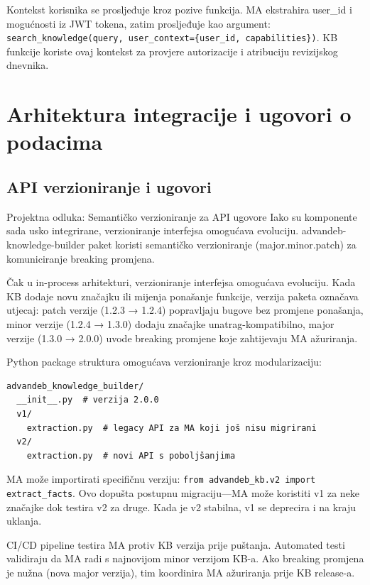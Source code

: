 \documentclass[12pt,a4paper]{article}
\begin{document}
Kontekst korisnika se prosljeđuje kroz pozive funkcija. MA ekstrahira user\_id i mogućnosti iz JWT tokena, zatim prosljeđuje kao argument: \texttt{search\_knowledge(query, user\_context=\{user\_id, capabilities\})}. KB funkcije koriste ovaj kontekst za provjere autorizacije i atribuciju revizijskog dnevnika.

\section{Arhitektura integracije i ugovori o podacima}

\subsection{API verzioniranje i ugovori}

\begin{rationale}{Projektna odluka: Semantičko verzioniranje za API ugovore}
Iako su komponente sada usko integrirane, verzioniranje interfejsa omogućava evoluciju. advandeb-knowledge-builder paket koristi semantičko verzioniranje (major.minor.patch) za komuniciranje breaking promjena.
\end{rationale}

Čak u in-process arhitekturi, verzioniranje interfejsa omogućava evoluciju. Kada KB dodaje novu značajku ili mijenja ponašanje funkcije, verzija paketa označava utjecaj: patch verzije (1.2.3 → 1.2.4) popravljaju bugove bez promjene ponašanja, minor verzije (1.2.4 → 1.3.0) dodaju značajke unatrag-kompatibilno, major verzije (1.3.0 → 2.0.0) uvode breaking promjene koje zahtijevaju MA ažuriranja.

Python package struktura omogućava verzioniranje kroz modularizaciju:
\begin{verbatim}
advandeb_knowledge_builder/
  __init__.py  # verzija 2.0.0
  v1/
    extraction.py  # legacy API za MA koji još nisu migrirani
  v2/
    extraction.py  # novi API s poboljšanjima
\end{verbatim}

MA može importirati specifičnu verziju: \texttt{from advandeb\_kb.v2 import extract\_facts}. Ovo dopušta postupnu migraciju—MA može koristiti v1 za neke značajke dok testira v2 za druge. Kada je v2 stabilna, v1 se deprecira i na kraju uklanja.

CI/CD pipeline testira MA protiv KB verzija prije puštanja. Automated testi validiraju da MA radi s najnovijom minor verzijom KB-a. Ako breaking promjena je nužna (nova major verzija), tim koordinira MA ažuriranja prije KB release-a.
\end{document}
